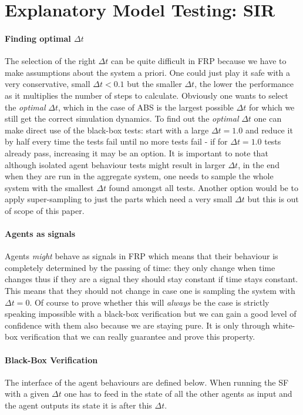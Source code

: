\section{Explanatory Model Testing: SIR}
\paragraph{Finding optimal $\Delta t$}
The selection of the right $\Delta t$ can be quite difficult in FRP because we have to make assumptions about the system a priori. One could just play it safe with a very conservative, small $\Delta t < 0.1$ but the smaller $\Delta t$, the lower the performance as it multiplies the number of steps to calculate. Obviously one wants to select the \textit{optimal} $\Delta t$, which in the case of ABS is the largest possible $\Delta t$ for which we still get the correct simulation dynamics.
To find out the \textit{optimal} $\Delta t$ one can make direct use of the black-box tests: start with a large $\Delta t = 1.0$ and reduce it by half every time the tests fail until no more tests fail - if for $\Delta t = 1.0$ tests already pass, increasing it may be an option. It is important to note that although isolated agent behaviour tests might result in larger $\Delta t$, in the end when they are run in the aggregate system, one needs to sample the whole system with the smallest $\Delta t$ found amongst all tests. Another option would be to apply super-sampling to just the parts which need a very small $\Delta t$ but this is out of scope of this paper.

\paragraph{Agents as signals}
Agents \textit{might} behave as signals in FRP which means that their behaviour is completely determined by the passing of time: they only change when time changes thus if they are a signal they should stay constant if time stays constant. This means that they should not change in case one is sampling the system with $\Delta t = 0$. Of course to prove whether this will \textit{always} be the case is strictly speaking impossible with a black-box verification but we can gain a good level of confidence with them also because we are staying pure. It is only through white-box verification that we can really guarantee and prove this property.

\paragraph{Black-Box Verification}
The interface of the agent behaviours are defined below. When running the SF with a given $\Delta t$ one has to feed in the state of all the other agents as input and the agent outputs its state it is after this $\Delta t$.

